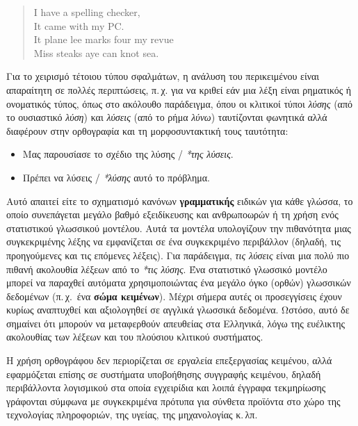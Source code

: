 \begin{multicols}{2}
\begin{quote}
  I have a spelling checker,\\
  It came with my PC.\\
  It plane lee marks four my revue\\
  Miss steaks aye can knot sea.
\end{quote}

Για το χειρισμό τέτοιου τύπου σφαλμάτων, η ανάλυση του περικειμένου είναι απαραίτητη σε πολλές περιπτώσεις, π.\,χ. για να κριθεί εάν μια λέξη είναι ρηματικός ή ονοματικός τύπος, όπως στο ακόλουθο παράδειγμα, όπου οι κλιτικοί τύποι  \textit{λύσης} (από το ουσιαστικό  \textit{λύση}) και  \textit{λύσεις} (από το ρήμα  \textit{λύνω}) ταυτίζονται φωνητικά αλλά διαφέρουν στην ορθογραφία και τη μορφοσυντακτική τους ταυτότητα:

\begin{itemize}
\item Μας παρουσίασε το σχέδιο της λύσης / \textit{*της λύσεις}.
\item Πρέπει να λύσεις / \textit{*λύσης} αυτό το πρόβλημα.
\end{itemize}

Αυτό απαιτεί είτε το σχηματισμό κανόνων \textbf{γραμματικής} ειδικών για κάθε γλώσσα, το οποίο συνεπάγεται μεγάλο βαθμό εξειδίκευσης και ανθρωποωρών ή τη χρήση ενός στατιστικού γλωσσικού μοντέλου. Αυτά τα μοντέλα υπολογίζουν την πιθανότητα μιας συγκεκριμένης λέξης να εμφανίζεται σε ένα συγκεκριμένο περιβάλλον (δηλαδή, τις προηγούμενες και τις επόμενες λέξεις). Για παράδειγμα, \textit{τις λύσεις} είναι μια πολύ πιο πιθανή ακολουθία λέξεων από το \textit{*τις λύσης}.
Ένα στατιστικό γλωσσικό μοντέλο μπορεί να παραχθεί αυτόματα χρησιμοποιώντας ένα μεγάλο όγκο (ορθών) γλωσσικών δεδομένων (π.\,χ.~ένα \textbf{σώμα κειμένων}). Μέχρι σήμερα αυτές οι προσεγγίσεις έχουν κυρίως αναπτυχθεί και αξιολογηθεί σε αγγλικά γλωσσικά δεδομένα. Ωστόσο, αυτό δε σημαίνει ότι μπορούν να μεταφερθούν απευθείας στα Ελληνικά, λόγω της ευέλικτης ακολουθίας των λέξεων και του πλούσιου κλιτικού συστήματος.


Η χρήση ορθογράφου δεν περιορίζεται σε εργαλεία επεξεργασίας κειμένου, αλλά εφαρμόζεται επίσης σε συστήματα  υποβοήθησης συγγραφής κειμένου, δηλαδή περιβάλλοντα λογισμικού στα οποία εγχειρίδια και λοιπά έγγραφα τεκμηρίωσης γράφονται σύμφωνα με συγκεκριμένα πρότυπα για σύνθετα προϊόντα στο χώρο της τεχνολογίας πληροφοριών, της υγείας, της μηχανολογίας κ.\,λπ.


\end{multicols}

